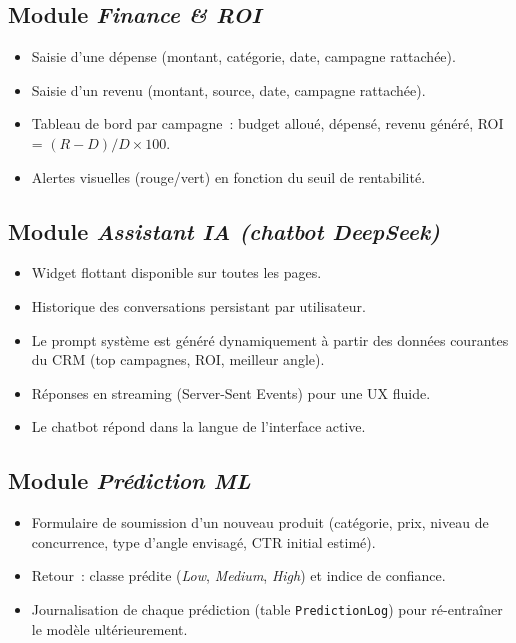 \subsection{Module \emph{Finance \& ROI}}

\begin{itemize}
    \item Saisie d'une dépense (montant, catégorie, date, campagne
    rattachée).
    \item Saisie d'un revenu (montant, source, date, campagne rattachée).
    \item Tableau de bord par campagne~: budget alloué, dépensé, revenu
    généré, ROI = $(R - D)/D \times 100$.
    \item Alertes visuelles (rouge/vert) en fonction du seuil de
    rentabilité.
\end{itemize}

\subsection{Module \emph{Assistant IA (chatbot DeepSeek)}}

\begin{itemize}
    \item Widget flottant disponible sur toutes les pages.
    \item Historique des conversations persistant par utilisateur.
    \item Le prompt système est généré dynamiquement à partir des données
    courantes du CRM (top campagnes, ROI, meilleur angle).
    \item Réponses en streaming (Server-Sent Events) pour une UX fluide.
    \item Le chatbot répond dans la langue de l'interface active.
\end{itemize}

\subsection{Module \emph{Prédiction ML}}

\begin{itemize}
    \item Formulaire de soumission d'un nouveau produit (catégorie, prix,
    niveau de concurrence, type d'angle envisagé, CTR initial estimé).
    \item Retour~: classe prédite (\emph{Low}, \emph{Medium}, \emph{High})
    et indice de confiance.
    \item Journalisation de chaque prédiction (table \texttt{PredictionLog})
    pour ré-entraîner le modèle ultérieurement.
\end{itemize}

